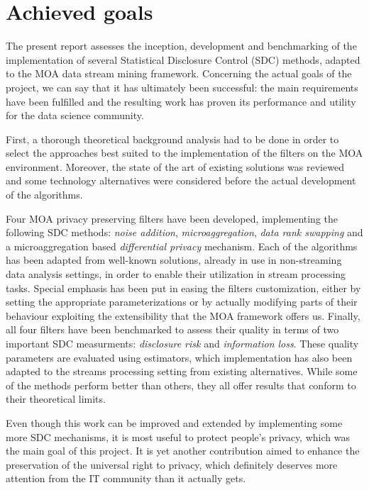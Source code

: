 \section{Achieved goals}
\label{Conclusions:Achieved}

The present report assesses the inception, development and benchmarking of the implementation of several Statistical Disclosure Control (SDC) methods, adapted to the MOA data stream mining framework. Concerning the actual goals of the project, we can say that it has ultimately been successful: the main requirements have been fulfilled and the resulting work has proven its performance and utility for the data science community.

First, a thorough theoretical background analysis had to be done in order to select the approaches best suited to the implementation of the filters on the MOA environment. Moreover, the state of the art of existing solutions was reviewed and some technology alternatives were considered before the actual development of the algorithms.

Four MOA privacy preserving filters have been developed, implementing the following SDC methods: \textit{noise addition}, \textit{microaggregation}, \textit{data rank swapping} and a microaggregation based \textit{differential privacy} mechanism. Each of the algorithms has been adapted from well-known solutions, already in use in non-streaming data analysis settings, in order to enable their utilization in stream processing tasks. Special emphasis has been put in easing the filters customization, either by setting the appropriate parameterizations or by actually modifying parts of their behaviour exploiting the extensibility that the MOA framework offers us. Finally, all four filters have been benchmarked to assess their quality in terms of two important SDC measurments: \textit{disclosure risk} and \textit{information loss}. These quality parameters are evaluated using estimators, which implementation has also been adapted to the streams processing setting from existing alternatives. While some of the methods perform better than others, they all offer results that conform to their theoretical limits.

Even though this work can be improved and extended by implementing some more SDC mechanisms, it is most useful to protect people's privacy, which was the main goal of this project. It is yet another contribution aimed to enhance the preservation of the universal right to privacy, which definitely deserves more attention from the IT community than it actually gets.

